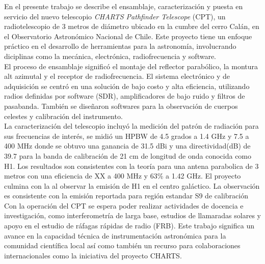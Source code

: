\documentclass[
	spanish, %
	letterpaper, oneside
]{book}
\begin{document}
\templatePortrait

\templatePagecfg

\begin{abstractd}
	En el presente trabajo se describe el ensamblaje, caracterización y puesta en servicio del nuevo telescopio \textit{CHARTS Pathfinder Telescope} (CPT), un radiotelescopio de 3 metros de diámetro ubicado en la cumbre del cerro Calán, en el Observatorio Astronómico Nacional de Chile. Este proyecto tiene un enfoque práctico en el desarrollo de herramientas para la astronomía, involucrando diciplinas como la mecánica, electrónica, radiofrecuencia y software.\\
	
	El proceso de ensamblaje significó el montaje del reflector parabólico, la montura alt azimutal y el receptor de radiofrecuencia. El sistema electrónico y de adquisición se centró en una solución de bajo costo y alta eficiencia, utilizando radios definidas por software (SDR), amplificadores de bajo ruido y filtros de pasabanda. También se diseñaron softwares para la observación de cuerpos celestes y calibración del instrumento.\\

	La caracterización del telescopio incluyó la medición del patrón de radiación para sus frecuencias de interés, se midió un HPBW de 4.5 grados a 1.4 GHz y 7.5 a 400 MHz donde se obtuvo una ganancia de 31.5 dBi y una directividad(dB) de 39.7 para la banda de calibración de 21 cm de longitud de onda conocida como H1. Los resultados son consistentes con la teoría para una antena parabolica de 3 metros con una eficiencia de XX a 400 MHz y 63\% a 1.42 GHz. El proyecto culmina con la  al observar la emisión de H1 en el centro galáctico. La observación es consistente con la emisión reportada para región estandar S9 de calibración\\

	Con la operación del CPT se espera poder realizar actividades de docencia e investigación, como interferometría de larga base, estudios de llamaradas solares y apoyo  en el estudio de ráfagas rápidas de radio (FRB). Este trabajo significa un avance en la capacidad técnica de instrumentación astronómica para la comunidad científica local así como también un recurso para colaboraciones internacionales como la iniciativa del proyecto CHARTS. \\
\end{abstractd}
\end{document}
